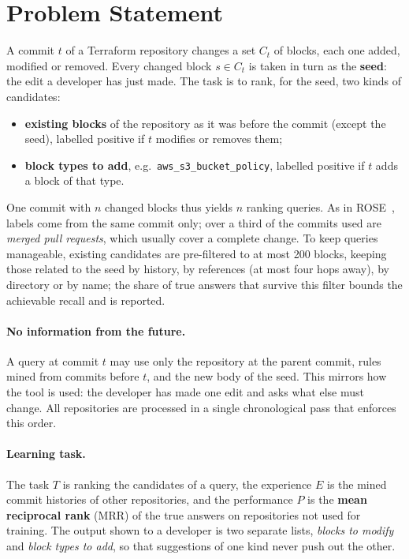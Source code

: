 \section{Problem Statement}
\label{sec:problem}

A commit $t$ of a Terraform repository changes a set $C_t$ of blocks, each one added, modified or
removed. Every changed block $s \in C_t$ is taken in turn as the \textbf{seed}: the edit a developer
has just made. The task is to rank, for the seed, two kinds of candidates:

\begin{itemize}
  \item \textbf{existing blocks} of the repository as it was before the commit (except the seed),
  labelled positive if $t$ modifies or removes them;
  \item \textbf{block types to add}, e.g.\ \texttt{aws\_s3\_bucket\_policy}, labelled positive if
  $t$ adds a block of that type.
\end{itemize}

One commit with $n$ changed blocks thus yields $n$ ranking queries. As in
ROSE~\cite{zimmermann2004rose}, labels come from the same commit only; over a third of the commits used are
\textit{merged pull requests}, which usually cover a complete change. To keep queries manageable,
existing candidates are pre-filtered to at most 200 blocks, keeping those related to the seed by
history, by references (at most four hops away), by directory or by name; the share of true answers
that survive this filter bounds the achievable recall and is reported.

\paragraph{No information from the future.} A query at commit $t$ may use only the repository at
the parent commit, rules mined from commits before $t$, and the new body of the seed. This mirrors
how the tool is used: the developer has made one edit and asks what else must change. All
repositories are processed in a single chronological pass that enforces this order.

\paragraph{Learning task.} The task $T$ is ranking the candidates of a query, the experience $E$ is the mined commit histories of other repositories, and the performance $P$ is the \textbf{mean reciprocal rank} (MRR) of the true answers on repositories not used for training. The output shown to a developer is two separate lists, \emph{blocks to modify} and \emph{block types to add}, so that suggestions of one kind never push out the other.

